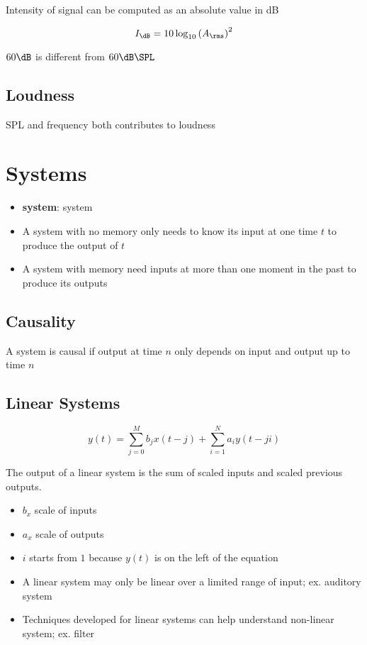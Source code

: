     Intensity of signal can be computed as an absolute value in dB

    \begin{equation}
      I_{\dB} = 10 \log_{10} \left( A_{\rms} \right)^{2}
    \end{equation}

    $ 60 \dB $ is different from $ 60 \dB \SPL $

  \subsection{Loudness}

    SPL and frequency both contributes to loudness

\section{Systems}

  \begin{itemize}
    \item \textbf{\Gls{system}}: \glsdesc{system}
    \item A system with no memory only needs to know its input at one time
    $ t $ to produce the output of $ t $
    \item A system with memory need inputs at more than one moment in the past
    to produce its outputs
  \end{itemize}

  \subsection{Causality}

    A system is causal if output at time $ n $ only depends on input and output
    up to time $ n $

  \subsection{Linear Systems}

    \begin{equation}
      y\left( t \right) =
        \sum_{j = 0}^{M} b_{j} x\left( t - j \right)
        + \sum_{i = 1}^{N} a_{i} y\left( t - ji \right)
    \end{equation}

    The output of a linear system is the sum of scaled inputs and
    scaled previous outputs.

    \begin{itemize}
      \item $ b_{x} $ scale of inputs
      \item $ a_{x} $ scale of outputs
      \item $ i $ starts from $ 1 $ because $ y\left( t \right) $ is on the left
      of the equation
      \item A linear system may only be linear over a limited range of input;
      ex. auditory system
      \item Techniques developed for linear systems can help understand
      non-linear system; ex. filter
    \end{itemize}

